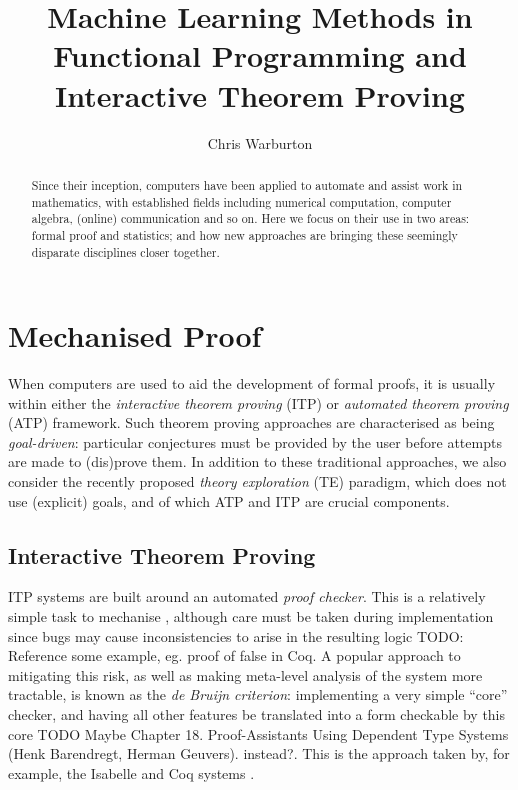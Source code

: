 \documentclass[]{article}
\begin{document}
\pagestyle{headings}  %

\title{Machine Learning Methods in Functional Programming and Interactive Theorem Proving}

\author{Chris Warburton}


\maketitle              %

\begin{abstract}
Since their inception, computers have been applied to automate and assist work in mathematics, with established fields including numerical computation, computer algebra, (online) communication and so on. Here we focus on their use in two areas: formal proof and statistics; and how new approaches are bringing these seemingly disparate disciplines closer together.
\end{abstract}

\section{Mechanised Proof}

When computers are used to aid the development of formal proofs, it is usually within either the \emph{interactive theorem proving} (ITP) or \emph{automated theorem proving} (ATP) framework. Such theorem proving approaches are characterised as being \emph{goal-driven}: particular conjectures must be provided by the user before attempts are made to (dis)prove them. In addition to these traditional approaches, we also consider the recently proposed \emph{theory exploration} (TE) paradigm, which does not use (explicit) goals, and of which ATP and ITP are crucial components.

\subsection{Interactive Theorem Proving}

ITP systems are built around an automated \emph{proof checker}. This is a relatively simple task to mechanise \cite{boyer1994qed}, although care must be taken during implementation since bugs may cause inconsistencies to arise in the resulting logic TODO: Reference some example, eg. proof of false in Coq. A popular approach to mitigating this risk, as well as making meta-level analysis of the system more tractable, is known as the \emph{de Bruijn criterion}: implementing a very simple ``core'' checker, and having all other features be translated into a form checkable by this core \cite[\S~3]{barendregt2005challenge} TODO Maybe Chapter 18. Proof-Assistants Using Dependent Type Systems (Henk Barendregt, Herman Geuvers). instead?. This is the approach taken by, for example, the Isabelle and Coq systems \cite{nipkow2002isabelle} \cite{bertot2013interactive}.
\end{document}
